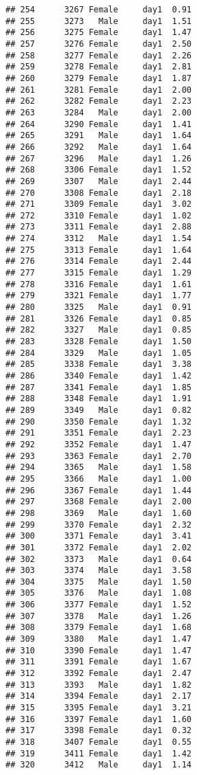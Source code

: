 \documentclass[
]{article}
\begin{document}
\begin{verbatim}
## 254      3267 Female     day1  0.91
## 255      3273   Male     day1  1.51
## 256      3275 Female     day1  1.47
## 257      3276 Female     day1  2.50
## 258      3277 Female     day1  2.26
## 259      3278 Female     day1  2.81
## 260      3279 Female     day1  1.87
## 261      3281 Female     day1  2.00
## 262      3282 Female     day1  2.23
## 263      3284   Male     day1  2.00
## 264      3290 Female     day1  1.41
## 265      3291   Male     day1  1.64
## 266      3292   Male     day1  1.64
## 267      3296   Male     day1  1.26
## 268      3306 Female     day1  1.52
## 269      3307   Male     day1  2.44
## 270      3308 Female     day1  2.18
## 271      3309 Female     day1  3.02
## 272      3310 Female     day1  1.02
## 273      3311 Female     day1  2.88
## 274      3312   Male     day1  1.54
## 275      3313 Female     day1  1.64
## 276      3314 Female     day1  2.44
## 277      3315 Female     day1  1.29
## 278      3316 Female     day1  1.61
## 279      3321 Female     day1  1.77
## 280      3325   Male     day1  0.91
## 281      3326 Female     day1  0.85
## 282      3327   Male     day1  0.85
## 283      3328 Female     day1  1.50
## 284      3329   Male     day1  1.05
## 285      3338 Female     day1  3.38
## 286      3340 Female     day1  1.42
## 287      3341 Female     day1  1.85
## 288      3348 Female     day1  1.91
## 289      3349   Male     day1  0.82
## 290      3350 Female     day1  1.32
## 291      3351 Female     day1  2.23
## 292      3352 Female     day1  1.47
## 293      3363 Female     day1  2.70
## 294      3365   Male     day1  1.58
## 295      3366   Male     day1  1.00
## 296      3367 Female     day1  1.44
## 297      3368 Female     day1  2.00
## 298      3369   Male     day1  1.60
## 299      3370 Female     day1  2.32
## 300      3371 Female     day1  3.41
## 301      3372 Female     day1  2.02
## 302      3373   Male     day1  0.64
## 303      3374   Male     day1  3.58
## 304      3375   Male     day1  1.50
## 305      3376   Male     day1  1.08
## 306      3377 Female     day1  1.52
## 307      3378   Male     day1  1.26
## 308      3379 Female     day1  1.68
## 309      3380   Male     day1  1.47
## 310      3390 Female     day1  1.47
## 311      3391 Female     day1  1.67
## 312      3392 Female     day1  2.47
## 313      3393   Male     day1  1.82
## 314      3394 Female     day1  2.17
## 315      3395 Female     day1  3.21
## 316      3397 Female     day1  1.60
## 317      3398 Female     day1  0.32
## 318      3407 Female     day1  0.55
## 319      3411 Female     day1  1.42
## 320      3412   Male     day1  1.14

\end{verbatim}
\end{document}
